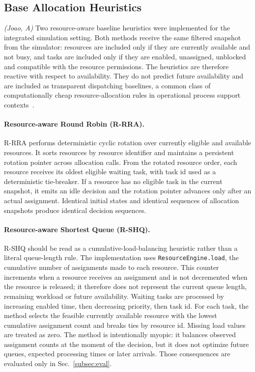 \subsection{Base Allocation Heuristics}\label{subsec:heuristics}
\textit{(Joao, A)}\quad
Two resource-aware baseline heuristics were implemented for the integrated
simulation setting. Both methods receive the same filtered snapshot from the
simulator: resources are included only if they are currently available and not
busy, and tasks are included only if they are enabled, unassigned, unblocked and
compatible with the resource permissions. The heuristics are therefore reactive
with respect to availability. They do not predict future availability and are
included as transparent dispatching baselines, a common class of computationally
cheap resource-allocation rules in operational process support
contexts~\cite{park2023predictiveallocation,pufahl2025resourceallocation}.

\paragraph{Resource-aware Round Robin (R-RRA).}
R-RRA performs deterministic cyclic rotation over currently eligible and
available resources. It sorts resources by resource identifier and maintains a
persistent rotation pointer across allocation calls. From the rotated resource
order, each resource receives its oldest eligible waiting task, with task id used
as a deterministic tie-breaker. If a resource has no eligible task in the current
snapshot, it emits an idle decision and the rotation pointer advances only after
an actual assignment. Identical initial states and identical sequences of
allocation snapshots produce identical decision sequences.

\paragraph{Resource-aware Shortest Queue (R-SHQ).}
R-SHQ should be read as a cumulative-load-balancing heuristic rather than a
literal queue-length rule. The implementation uses
\texttt{ResourceEngine.load}, the cumulative number of assignments made to each
resource. This counter increments when a resource receives an assignment and is
not decremented when the resource is released; it therefore does not represent
the current queue length, remaining workload or future availability. Waiting
tasks are processed by increasing enabled time, then decreasing priority, then
task id. For each task, the method selects the feasible currently available
resource with the lowest cumulative assignment count and breaks ties by resource
id. Missing load values are treated as zero. The method is intentionally myopic:
it balances observed assignment counts at the moment of the decision, but it
does not optimize future queues, expected processing times or later arrivals.
Those consequences are evaluated only in Sec.~\ref{subsec:eval}.
